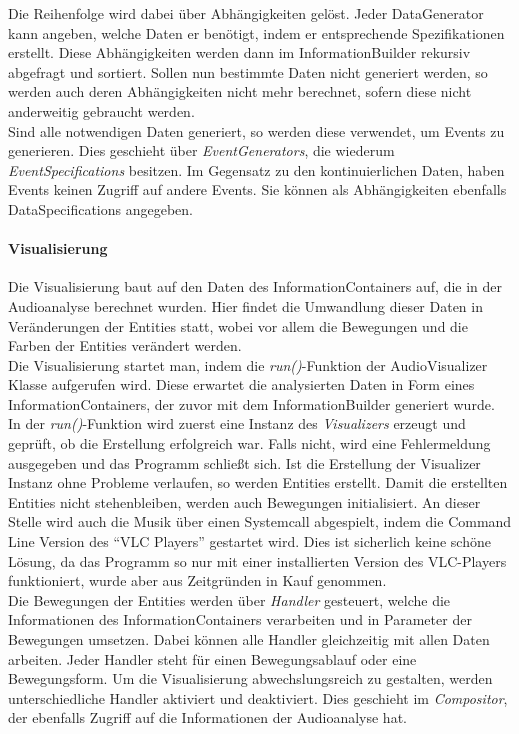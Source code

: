 \documentclass[11pt,a4paper]{article}
\begin{document}
Die Reihenfolge wird dabei über Abhängigkeiten gelöst. Jeder DataGenerator kann angeben, welche Daten er benötigt, indem er entsprechende Spezifikationen erstellt. Diese Abhängigkeiten werden dann im InformationBuilder rekursiv abgefragt und sortiert. Sollen nun bestimmte Daten nicht generiert werden, so werden auch deren Abhängigkeiten nicht mehr berechnet, sofern diese nicht anderweitig gebraucht werden.\\
Sind alle notwendigen Daten generiert, so werden diese verwendet, um Events zu generieren. Dies geschieht über \textit{EventGenerators}, die wiederum \textit{EventSpecifications} besitzen. Im Gegensatz zu den kontinuierlichen Daten, haben Events keinen Zugriff auf andere Events. Sie können als Abhängigkeiten ebenfalls DataSpecifications angegeben.

\paragraph{Visualisierung}
Die Visualisierung baut auf den Daten des InformationContainers auf, die in der Audioanalyse berechnet wurden. Hier findet die Umwandlung dieser Daten in Veränderungen der Entities statt, wobei vor allem die Bewegungen und die Farben der Entities verändert werden.\\
Die Visualisierung startet man, indem die \textit{run()}-Funktion der AudioVisualizer Klasse aufgerufen wird. Diese erwartet die analysierten Daten in Form eines InformationContainers, der zuvor mit dem InformationBuilder generiert wurde. In der \textit{run()}-Funktion wird zuerst eine Instanz des \textit{Visualizers} erzeugt und geprüft, ob die Erstellung erfolgreich war. Falls nicht, wird eine Fehlermeldung ausgegeben und das Programm schließt sich. Ist die Erstellung der Visualizer Instanz ohne Probleme verlaufen, so werden Entities erstellt. Damit die erstellten Entities nicht stehenbleiben, werden auch Bewegungen initialisiert. An dieser Stelle wird auch die Musik über einen Systemcall abgespielt, indem die Command Line Version des ``VLC Players'' gestartet wird. Dies ist sicherlich keine schöne Lösung, da das Programm so nur mit einer installierten Version des VLC-Players funktioniert, wurde aber aus Zeitgründen in Kauf genommen.\\
Die Bewegungen der Entities werden über \textit{Handler} gesteuert, welche die Informationen des InformationContainers verarbeiten und in Parameter der Bewegungen umsetzen. Dabei können alle Handler gleichzeitig mit allen Daten arbeiten. Jeder Handler steht für einen Bewegungsablauf oder eine Bewegungsform. Um die Visualisierung abwechslungsreich zu gestalten, werden unterschiedliche Handler aktiviert und deaktiviert. Dies geschieht im \textit{Compositor}, der ebenfalls Zugriff auf die Informationen der Audioanalyse hat.
\end{document}
